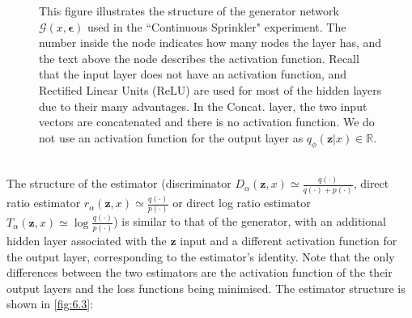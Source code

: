 \documentclass[honours,12pt]{unswthesis}
\newcommand{\R}{\mathbb{R}}
\numberwithin{equation}{section}
\theoremstyle{definition}
\begin{document}
\begin{figure}[h!]
\caption{\small This figure illustrates the structure of the generator network $\mathcal{G}(x,\bm{\epsilon})$ used in the ``Continuous Sprinkler" experiment. The number inside the node indicates how many nodes the layer has, and the text above the node describes the activation function. Recall that the input layer does not have an activation function, and Rectified Linear Units (ReLU) are used for most of the hidden layers due to their many advantages. In the Concat. layer, the two input vectors are concatenated and there is no activation function. We do not use an activation function for the output layer as $q_\phi(\bm{z}|x)\in \R$.}
\label{fig:6.2}
\end{figure}\\
The structure of the estimator (discriminator $D_\alpha(\bm{z},x)\simeq \frac{q(\cdot)}{q(\cdot)+p(\cdot)}$, direct ratio estimator $r_\alpha(\bm{z},x)\simeq \frac{q(\cdot)}{p(\cdot)}$ or direct log ratio estimator $T_\alpha(\bm{z},x)\simeq \log \frac{q(\cdot)}{p(\cdot)}$) is similar to that of the generator, with an additional hidden layer associated with the $\bm{z}$ input and a different activation function for the output layer, corresponding to the estimator's identity. Note that the only differences between the two estimators are the activation function of the their output layers and the loss functions being minimised. The estimator structure is shown in \autoref{fig:6.3}:
\end{document}
